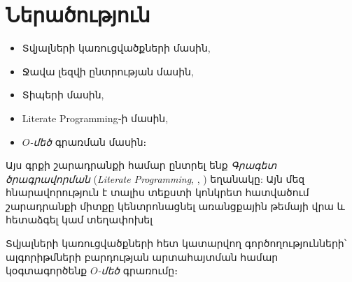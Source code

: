 \chapter{Ներածություն}

\begin{itemize}
  \item Տվյալների կառուցվածքների մասին,
  \item Ջավա լեզվի ընտրության մասին,
  \item Տիպերի մասին,
  \item Literate Programming֊ի մասին,
  \item \(O\)\textit{-մեծ} գրառման մասին։
\end{itemize}


\smallskip
Այս գրքի շարադրանքի համար ընտրել ենք \emph{Գրագետ ծրագրավորման}
(\emph{Literate Programming}, \cite{LitProgArt}, \cite{LitProgBook})
եղանակը: Այն մեզ հնարավորություն է տալիս տեքստի կոնկրետ հատվածում
շարադրանքի միտքը կենտրոնացնել առանցքային թեմայի վրա և հետաձգել կամ
տեղափոխել

\smallskip
Տվյալների կառուցվածքների հետ կատարվող գործողությունների՝ ալգորիթմների
բարդության արտահայտման համար կօգտագործենք \(O\)\textit{-մեծ} գրառումը։
